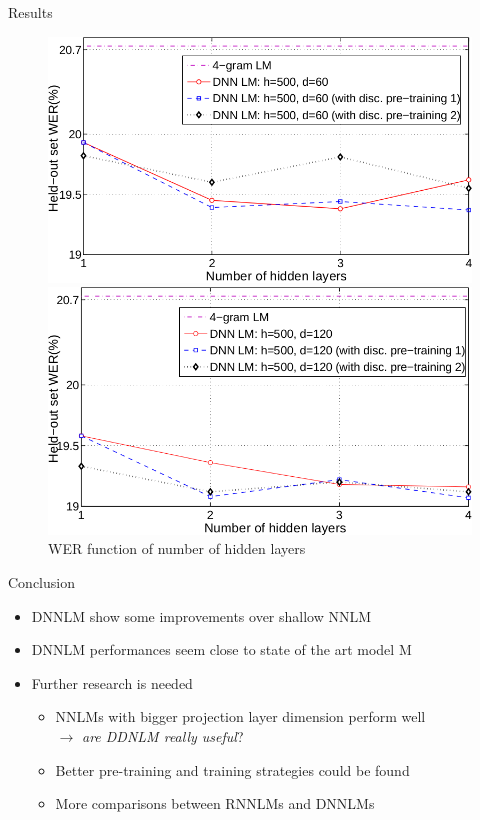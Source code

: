 \documentclass{beamer}
\begin{document}
\begin{frame}{Results}
	\begin{figure}[!htb]
		\centering
			\begin{minipage}{0.45\textwidth}
				    \includegraphics[width=\linewidth]{./images/results4.png}
			\end{minipage}
			\hspace{5mm}
			\begin{minipage}{0.45\textwidth}
				    \includegraphics[width=\linewidth]{./images/results5.png}
			\end{minipage}
		\caption{WER function of number of hidden layers}
	\end{figure}
\end{frame}

\begin{frame}{Conclusion}
	\begin{itemize}
		\item DNNLM show some improvements over shallow NNLM
		\item DNNLM performances seem close to state of the art model M
		\item Further research is needed
		\begin{itemize}
			\item NNLMs with bigger projection layer dimension perform well \\$\rightarrow$ \textit{are DDNLM really useful}?
			\item Better pre-training and training strategies could be found
			\item More comparisons between RNNLMs and DNNLMs
		\end{itemize}
	\end{itemize}
\end{frame}
\end{document}
